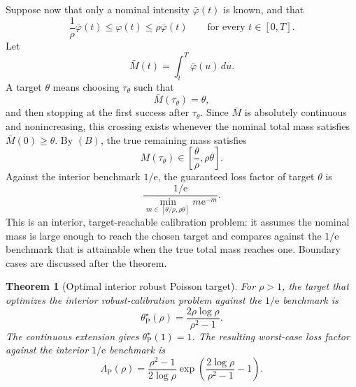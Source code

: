 \documentclass[11pt,a4paper]{article}
\newtheorem{theorem}{Theorem}
\newcommand{\e}{\mathrm e}
\begin{document}
Suppose now that only a nominal intensity \(\bar\varphi(t)\) is known, and that
\[
  \boxed{
  \frac1\rho\bar\varphi(t)\le\varphi(t)\le\rho\bar\varphi(t)
  }
  \qquad\text{for every }t\in[0,T].
  \tag{B}
\]
Let
\[
  \bar M(t)=\int_t^T\bar\varphi(u)\,du.
\]
A target \(\theta\) means choosing \(\tau_\theta\) such that
\[
  \bar M(\tau_\theta)=\theta,
\]
and then stopping at the first success after \(\tau_\theta\).  Since
\(\bar M\) is absolutely continuous and nonincreasing, this crossing exists
whenever the nominal total mass satisfies \(\bar M(0)\ge\theta\).  By \((B)\),
the true remaining mass satisfies
\[
  M(\tau_\theta)\in\left[\frac{\theta}{\rho},\rho\theta\right].
\]
Against the interior benchmark \(1/\e\), the guaranteed loss factor of target
\(\theta\) is
\[
  \frac{1/\e}{\min_{m\in[\theta/\rho,\rho\theta]}m\e^{-m}}.
\]
This is an interior, target-reachable calibration problem: it assumes the
nominal mass is large enough to reach the chosen target and compares against
the \(1/\e\) benchmark that is attainable when the true total mass reaches one.
Boundary cases are discussed after the theorem.

\begin{theorem}[Optimal interior robust Poisson target]
\label{thm:poisson-robust}
For \(\rho>1\), the target that optimizes the interior robust-calibration problem
against the \(1/\e\) benchmark is
\[
  \boxed{
  \theta^\star_{\mathrm P}(\rho)
  =
  \frac{2\rho\log\rho}{\rho^2-1}.
  }
  \tag{9}
\]
The continuous extension gives \(\theta^\star_{\mathrm P}(1)=1\).  The resulting
worst-case loss factor against the interior \(1/\e\) benchmark is
\[
  \boxed{
  \Lambda_{\mathrm P}(\rho)
  =
  \frac{\rho^2-1}{2\log\rho}
  \exp\left(\frac{2\log\rho}{\rho^2-1}-1\right).
  }
  \tag{10}
\]
\end{theorem}
\end{document}
